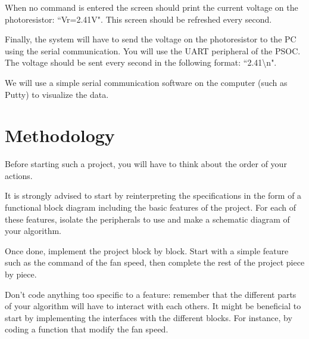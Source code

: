\documentclass[11pt,a4paper]{article}
\theoremstyle{definition}%
\begin{document}
When no command is entered the screen should print the current voltage on the photoresistor: ``Vr=2.41V".
This screen should be refreshed every second.

Finally, the system will have to send the voltage on the photoresistor to the PC using the serial communication.
You will use the UART peripheral of the PSOC.
The voltage should be sent every second in the following format: ``2.41\textbackslash n".

We will use a simple serial communication software on the computer (such as Putty) to visualize the data. 








\section{Methodology}
Before starting such a project, you will have to think about the order of your actions.

It is strongly advised to start by reinterpreting the specifications in the form of a functional block diagram including the basic features of the project.
For each of these features, isolate the peripherals to use and make a schematic diagram of your algorithm.

Once done, implement the project block by block.
Start with a simple feature such as the command of the fan speed, then complete the rest of the project piece by piece.

Don't code anything too specific to a feature: remember that the different parts of your algorithm will have to interact with each others.
It might be beneficial to start by implementing the interfaces with the different blocks.
For instance, by coding a function that modify the fan speed.
\end{document}
